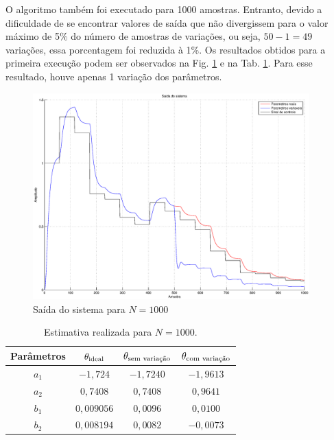 O algoritmo também foi executado para 1000 amostras. Entranto, devido a
dificuldade de se encontrar valores de saída que não divergissem para o valor
máximo de 5\% do número de amostras de variações, ou seja, $50 - 1 = 49$
variações, essa porcentagem foi reduzida à 1\%. Os resultados obtidos para a
primeira execução podem ser observados na Fig. \ref{fig:saida_sist_1000} e na
Tab. \ref{tab:estimativa_1000}. Para esse resultado, houve apenas 1 variação dos
parâmetros.

\begin{figure}[htb]
\centering
    \includegraphics[width=0.95\textwidth]{imgs/questao2/saida_1000}
    \caption{Saída do sistema para $N = 1000$}
    \label{fig:saida_sist_1000}
\end{figure}

\begin{table}
\centering
    \caption{Estimativa realizada para $N = 1000$.}
    \label{tab:estimativa_1000}
    \vspace{0.25cm}
    \begin{tabular}{|c|c|c|c|}
        \hline
        Parâmetros & 
        $\mathbf{\theta}_{\text{ideal}}$&
        $\mathbf{\theta}_{\text{sem variação}}$&
        $\mathbf{\theta}_{\text{com variação}}$\\
        \hline
        \hline
        $a_1$ & $-1,724$   & $-1,7240$ & $-1,9613$ \\
        \hline
        $a_2$ & $0,7408$   & $0,7408$  & $0,9641$ \\
        \hline
        $b_1$ & $0,009056$ & $0,0096$  & $0,0100$ \\
        \hline
        $b_2$ & $0,008194$ & $0,0082$  & $-0,0073$ \\
        \hline
    \end{tabular}
\end{table}


